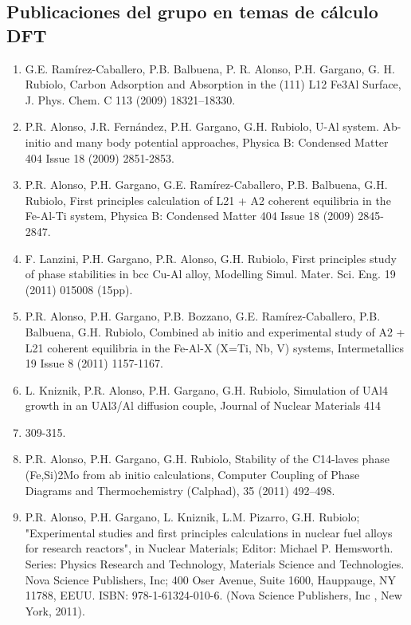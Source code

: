 \subsection{ Publicaciones del grupo en temas de cálculo DFT}

\begin{enumerate}
\item  G.E. Ramírez-Caballero, P.B. Balbuena, P. R. Alonso, P.H. Gargano, G. 
H. Rubiolo, Carbon Adsorption and Absorption in the (111) L12 Fe3Al Surface, J. 
Phys. Chem. C 113 (2009) 18321–18330.

\item  P.R. Alonso, J.R. Fernández, P.H. Gargano, G.H. Rubiolo, U-Al system. 
Ab-initio and many body potential approaches, Physica B: Condensed Matter 404 
Issue 18 (2009) 2851-2853.

\item P.R. Alonso, P.H. Gargano, G.E. Ramírez-Caballero, P.B. Balbuena, G.H. 
Rubiolo, First principles calculation of L21 + A2 coherent equilibria in the 
Fe-Al-Ti system, Physica B: Condensed Matter 404 Issue 18 (2009) 2845-2847. 

\item  F. Lanzini, P.H. Gargano, P.R. Alonso, G.H. Rubiolo, First principles 
study of phase stabilities in bcc Cu-Al alloy, Modelling Simul. Mater. Sci. 
Eng. 19 (2011) 015008 (15pp).

\item  P.R. Alonso, P.H. Gargano, P.B. Bozzano, G.E. Ramírez-Caballero, P.B. 
Balbuena, G.H. Rubiolo, Combined ab initio and experimental study of A2 + L21 
coherent equilibria in the Fe-Al-X (X=Ti, Nb, V) systems, Intermetallics 19 
Issue 8 (2011) 1157-1167. 

\item  L. Kniznik, P.R. Alonso, P.H. Gargano, G.H. Rubiolo, Simulation of 
UAl4 growth in an UAl3/Al diffusion couple, Journal of Nuclear Materials 414 

\item 309-315. 

\item  P.R. Alonso, P.H. Gargano, G.H. Rubiolo, Stability of the C14-laves 
phase (Fe,Si)2Mo from ab initio calculations, Computer Coupling of Phase 
Diagrams and Thermochemistry (Calphad), 35 (2011) 492–498. 

\item  P.R. Alonso, P.H. Gargano, L. Kniznik, L.M. Pizarro, G.H. Rubiolo; 
"Experimental studies and first principles calculations in nuclear fuel alloys 
for research reactors", in Nuclear Materials; Editor: Michael P. Hemsworth. 
Series: Physics Research and Technology, Materials Science and Technologies. 
Nova Science Publishers, Inc; 400 Oser Avenue, Suite 1600, Hauppauge, NY 11788, 
EEUU. ISBN: 978-1-61324-010-6. (Nova Science Publishers, Inc , New York, 2011).


\end{enumerate}
